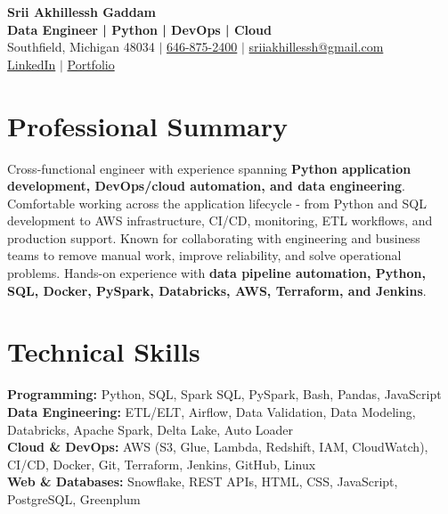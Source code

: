 \documentclass[letterpaper,10pt]{article}
\begin{document}
\fontsize{9.35pt}{10.45pt}\selectfont

\begin{center}
    {\LARGE \textbf{Srii Akhillessh Gaddam}} \\[-1pt]
    \textbf{Data Engineer | Python | DevOps | Cloud} \\[2pt]
    Southfield, Michigan 48034 $|$
    \href{tel:6468752400}{646-875-2400} $|$
    \href{mailto:sriiakhillessh@gmail.com}{sriiakhillessh@gmail.com} \\[1pt]
    \href{https://www.linkedin.com/in/srii-akhiilessh-gaddam-b48668191/}{LinkedIn} $|$
    \href{https://sriiakhillesshg.github.io/portfolio/}{Portfolio}
\end{center}
\vspace{-8pt}

\section{Professional Summary}
\small{Cross-functional engineer with experience spanning \textbf{Python application development, DevOps/cloud automation, and data engineering}. Comfortable working across the application lifecycle - from Python and SQL development to AWS infrastructure, CI/CD, monitoring, ETL workflows, and production support. Known for collaborating with engineering and business teams to remove manual work, improve reliability, and solve operational problems. Hands-on experience with \textbf{data pipeline automation, Python, SQL, Docker, PySpark, Databricks, AWS, Terraform, and Jenkins}.}

\section{Technical Skills}
\small{
\textbf{Programming:} Python, SQL, Spark SQL, PySpark, Bash, Pandas, JavaScript \\
\textbf{Data Engineering:} ETL/ELT, Airflow, Data Validation, Data Modeling, Databricks, Apache Spark, Delta Lake, Auto Loader \\
\textbf{Cloud \& DevOps:} AWS (S3, Glue, Lambda, Redshift, IAM, CloudWatch), CI/CD, Docker, Git, Terraform, Jenkins, GitHub, Linux \\
\textbf{Web \& Databases:} Snowflake, REST APIs, HTML, CSS, JavaScript, PostgreSQL, Greenplum
}

\end{document}
